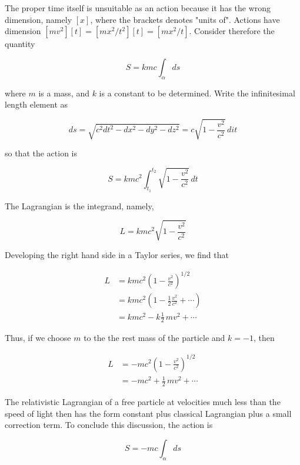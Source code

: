 The proper time itself is unsuitable as an action because it has the wrong dimension, namely $[x]$, where the brackets denotes "units of". Actions have dimension $[mv^2][t] = [mx^2 / t^2][t] = [mx^2/t]$.  Consider therefore the quantity

\begin{equation}
S = kmc \int_\alpha ds
\end{equation}

where $m$ is a mass, and $k$ is a constant to be determined.  Write the infinitesimal length element as

\begin{equation}
ds = \sqrt{c^2 dt^2 - dx^2 - dy^2 - dz^2} = c\sqrt{1 - \frac{ v^2}{ c^2}}\,dit
\end{equation}

so that the action is

\begin{equation}
S = kmc^2 \int_{t_1}^{t_2}\sqrt{1 - \frac{ v^2}{ c^2}}\,dt
\end{equation}

The Lagrangian is the integrand, namely,

\begin{equation}
L = kmc^2 \sqrt{1 - \frac{ v^2}{ c^2}}
\end{equation}

Developing the right hand side in a Taylor series, we find that

\begin{align}
L &= kmc^2 \left(1 - \frac{ v^2}{ c^2 }\right)^{1/2 } \\
 &= kmc^2 \left(1 - \frac{1}{2}\frac{ v^2}{ c^2} + \cdots\right) \\
 &= kmc^2 - k\frac{1}{2}\,mv^2 + \cdots
\end{align}

Thus, if we choose $m$ to the the rest mass of the particle and $k = -1$, then

\begin{align}
L &= -mc^2 \left(1 - \frac{ v^2}{ c^2 }\right)^{1/2 } \\
& =  -mc^2  + \frac{1}{2}\,mv^2 + \cdots
\end{align}

The relativistic Lagrangian of a free particle at velocities much less than the speed of light then has the form constant plus classical Lagrangian plus a small correction term.  To conclude this discussion, the action is

\begin{equation}
S = -mc\int_\alpha ds
\end{equation}






